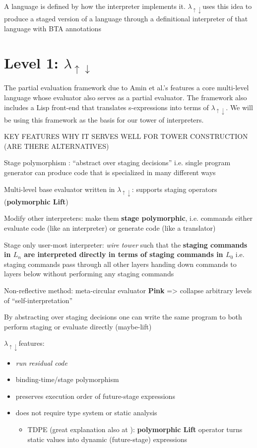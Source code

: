 \documentclass{article}
\theoremstyle{definition}
\newcommand{\mslang}{$\lambda_{\uparrow\downarrow}$}
\begin{document}
A language is defined by how the interpreter implements it. \mslang uses this idea to produce a staged version of a language through a definitional interpreter of that language with BTA annotations

\section{Level 1: \texorpdfstring{\mslang}{Lg}}\label{sec:mslang}
The partial evaluation framework due to Amin et al.'s \cite{amin2017collapsing} features a core multi-level language whose evaluator also serves as a partial evaluator. The framework also includes a Lisp front-end that translates s-expressions into terms of \mslang. We will be using this framework as the basis for our tower of interpreters.

KEY FEATURES
WHY IT SERVES WELL FOR TOWER CONSTRUCTION (ARE THERE ALTERNATIVES)

Stage polymorphism \cite{ofenbeck2017staging}: ``abstract over staging decisions'' i.e. single program generator can produce code that is specialized in many different ways

Multi-level base evaluator written in \mslang: supports staging operators (\textbf{polymorphic Lift})

Modify other interpreters: make them \textbf{stage polymorphic}, i.e. commands either evaluate code (like an interpreter) or generate code (like a translator)

Stage only user-most interpreter: \textit{wire tower} such that the \textbf{staging commands in $L_{n}$ are interpreted directly in terms of staging commands in $L_{0}$} i.e. staging commands pass through all other layers handing down commands to layers below without performing any staging commands

Non-reflective method: meta-circular evaluator \textbf{Pink} => collapse arbitrary levels of ``self-interpretation''

By abstracting over staging decisions one can write the same program to both perform staging or evaluate directly \cite{amin2017collapsing} (maybe-lift)

\mslang features:
	\begin{itemize}
		\item \textit{run residual code}
		\item binding-time/stage polymorphism \cite{henglein1994polymorphic}
		\item preserves execution order of future-stage expressions
		\item does not require type system or static analysis
		\begin{itemize}
			\item TDPE \cite{danvy1999type} (great explanation also at \cite{grobauer2001second}): \textbf{polymorphic Lift} operator turns static values into dynamic (future-stage) expressions
		\end{itemize}
	\end{itemize}
\end{document}
